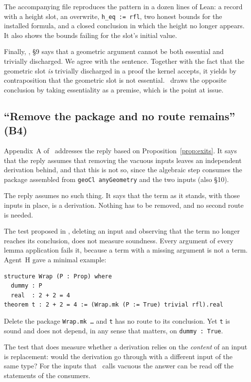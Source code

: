 The accompanying file  reproduces the pattern in a dozen lines of Lean: a record with a height slot, an overwrite, \texttt{h\_eq := rfl}, two honest bounds for the installed formula,
and a closed conclusion in which the height no longer appears. It also shows the bounds failing for the slot's initial value.

Finally, \N, \S9 says that a geometric argument cannot be both essential and trivially discharged. We agree with the sentence. Together with the fact that the geometric slot \emph{is} trivially discharged in a proof the kernel accepts, it yields by contraposition that the geometric slot is not essential.
\N\ draws the opposite conclusion by taking essentiality as a premise, which is the point at issue.

\subsection{``Remove the package and no route remains'' (B4)}
\label{sec:remove}

Appendix~A of \N\ addresses the reply based on Proposition~\ref{prop:exits}. It says that the reply assumes that removing the vacuous inputs leaves an independent derivation behind,
and that this is not so, since the algebraic step consumes the package assembled from \texttt{geoCl anyGeometry} and the two  inputs (also \S10).

The reply assumes no such thing. It says that the term as it stands, with those inputs in place, is a derivation. Nothing has to be removed, and no second route is needed.

The test proposed in \N, deleting an input and observing that the term no longer reaches its conclusion, does not measure soundness.
Every argument of every lemma application fails it, because a term with a missing argument is not a term. Agent~H gave a minimal example:
\begin{Verbatim}[fontsize=\small,frame=single,rulecolor=\color{gray!50}]
structure Wrap (P : Prop) where
  dummy : P
  real  : 2 + 2 = 4
theorem t : 2 + 2 = 4 := (Wrap.mk (P := True) trivial rfl).real
\end{Verbatim}
\noindent Delete the package \texttt{Wrap.mk …} and \texttt{t} has no route to its conclusion. Yet \texttt{t} is sound and does not depend, in any sense that matters, on \texttt{dummy : True}.

The test that does measure whether a derivation relies on the \emph{content} of an input is replacement: would the derivation go through with a different input of the same type?
For the inputs that \N\ calls vacuous the answer can be read off the statements of the consumers.

